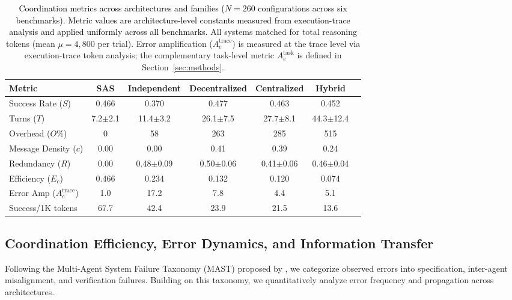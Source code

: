 
\begin{table}[t!]
  \centering
  \caption{\textcolor{black}{Coordination metrics across architectures and families ($N=260$ configurations across six benchmarks). Metric values are architecture-level constants measured from execution-trace analysis and applied uniformly across all benchmarks.} All systems matched for total reasoning tokens (mean $\mu=4,800$ per trial). Error amplification ($A_e^{\text{trace}}$) is measured at the trace level via execution-trace token analysis; the complementary task-level metric $A_e^{\text{task}}$ is defined in Section~\ref{sec:methods}.}
  \label{tab:coord_metrics}
  {
  \begin{tabular}{lcccccc}
  \toprule
  \textbf{Metric} & \textbf{SAS} & \textbf{Independent} &\textbf{Decentralized} & \textbf{Centralized} & \textbf{Hybrid} \\
  \midrule
  Success Rate ($S$) & 0.466 & 0.370 & 0.477 & 0.463 & 0.452 \\
  Turns ($T$) & 7.2{\scriptsize$\pm$2.1} & 11.4{\scriptsize$\pm$3.2} & 26.1{\scriptsize$\pm$7.5} & 27.7{\scriptsize$\pm$8.1} & 44.3{\scriptsize$\pm$12.4} \\
  Overhead ($O\%$) & 0 & 58 & 263 & 285 & 515 \\
  Message Density ($c$) & 0.00 & 0.00 & 0.41 & 0.39 & 0.24 \\
  Redundancy ($R$) & 0.00 & 0.48{\scriptsize$\pm$0.09} & 0.50{\scriptsize$\pm$0.06} & 0.41{\scriptsize$\pm$0.06} & 0.46{\scriptsize$\pm$0.04} \\
  Efficiency ($E_c$) & 0.466 & 0.234 & 0.132 & 0.120 & 0.074 \\
  Error Amp ($A_e^{\text{trace}}$) & 1.0 & 17.2 & 7.8 & 4.4 & 5.1 \\
  Success/1K tokens & 67.7 & 42.4 & 23.9 & 21.5 & 13.6 \\
  \bottomrule
  \end{tabular}
  }
  
\end{table}

  
\subsection{Coordination Efficiency, Error Dynamics, and Information Transfer}
\label{subsec:coord_eff}

  Following the Multi-Agent System Failure Taxonomy (MAST) proposed by \cite{cemri2025multi}, we categorize observed errors into specification, inter-agent misalignment, and verification failures. Building on this taxonomy, we quantitatively analyze error frequency and propagation across architectures.
  
